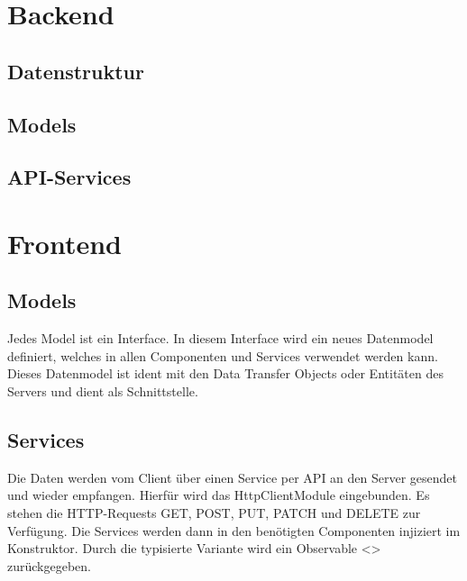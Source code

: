 \section{Backend}

\subsection{Datenstruktur}
\subsection{Models}
\subsection{API-Services}

\section{Frontend}

\subsection{Models}
Jedes Model ist ein Interface. In diesem Interface wird ein neues Datenmodel definiert,
welches in allen Componenten und Services verwendet werden kann. Dieses Datenmodel
ist ident mit den Data Transfer Objects oder Entitäten des Servers und dient als
Schnittstelle.
\subsection{Services}
Die Daten werden vom Client über einen Service per API an den Server gesendet
und wieder empfangen. Hierfür wird das HttpClientModule eingebunden. Es stehen
die HTTP-Requests GET, POST, PUT, PATCH und DELETE zur Verfügung. Die
Services werden dann in den benötigten Componenten injiziert im Konstruktor. Durch
die typisierte Variante wird ein Observable <> zurückgegeben.